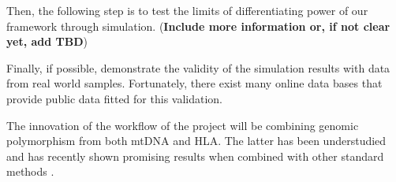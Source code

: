 \documentclass[10pt]{article}
\begin{document}
Then, the following step is to test the limits of differentiating power of our framework through simulation. (\textbf{Include more information or, if not clear yet, add TBD})

Finally, if possible, demonstrate the validity of the simulation results with data from real world samples. Fortunately, there exist many online data bases that provide public data fitted for this validation.

The innovation of the workflow of the project will be combining genomic polymorphism from both mtDNA and HLA. The latter has been understudied and has recently shown promising results when combined with other standard methods \cite{Kuffel2019}. 








\printbibliography
\end{document}
